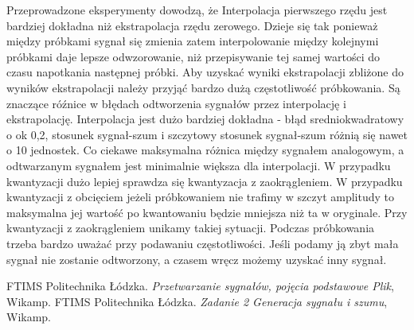 \documentclass[12pt]{article}
\begin{document}
Przeprowadzone eksperymenty dowodzą, że  Interpolacja pierwszego rzędu jest bardziej dokładna niż ekstrapolacja rzędu zerowego.  Dzieje się tak ponieważ między próbkami sygnał się zmienia zatem interpolowanie między kolejnymi próbkami daje lepsze odwzorowanie, niż przepisywanie tej samej wartości do czasu napotkania następnej próbki.
Aby uzyskać wyniki ekstrapolacji zbliżone do wyników ekstrapolacji należy przyjąć bardzo dużą częstotliwość próbkowania. Są znaczące róźnice w błędach odtworzenia sygnałów przez interpolację i ekstrapolację. Interpolacja jest dużo bardziej dokładna - błąd sredniokwadratowy o ok 0,2, stosunek sygnał-szum i szczytowy stosunek sygnał-szum różnią się nawet o 10 jednostek. Co ciekawe maksymalna różnica między sygnałem analogowym, a odtwarzanym sygnałem jest minimalnie większa dla interpolacji.
W przypadku kwantyzacji dużo lepiej sprawdza się kwantyzacja z zaokrągleniem. W przypadku kwantyzacji z obcięciem jeżeli próbkowaniem nie trafimy w szczyt amplitudy to maksymalna jej wartość po kwantowaniu będzie mniejsza niż ta w oryginale. Przy kwantyzacji z zaokrągleniem unikamy takiej sytuacji.
Podczas próbkowania trzeba bardzo uważać przy podawaniu częstotliwości. Jeśli podamy ją zbyt mała sygnał nie zostanie odtworzony, a czasem wręcz możemy uzyskać inny sygnał.
\begin{thebibliography}{0}
    FTIMS Politechnika Łódzka.
    \textsl{Przetwarzanie sygnałów, pojęcia podstawowe Plik}, Wikamp.
  FTIMS Politechnika Łódzka.
    \textsl{Zadanie 2 Generacja sygnału i szumu}, Wikamp.
\end{thebibliography}
\end{document}
